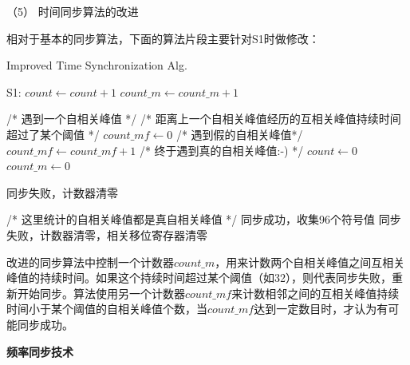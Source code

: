 \documentclass[titlepage]{article}
\numberwithin{figure}{section}
\numberwithin{equation}{section}
\begin{document}
（5） 时间同步算法的改进

相对于基本的同步算法，下面的算法片段主要针对S1时做修改：

\begin{algorithm}[H]
\caption{Improved Time Synchronization Alg.}
\begin{algorithmic}[1]
\State S1:
\State $count \gets count + 1$
\Else
\State $count\_m \gets count\_m + 1$
\EndIf

 /* 遇到一个自相关峰值 */
 /* 距离上一个自相关峰值经历的互相关峰值持续时间超过了某个阈值 */
\State $count\_mf \gets 0$ /* 遇到假的自相关峰值*/
\Else
\State $count\_mf \gets count\_mf + 1$ /* 终于遇到真的自相关峰值:-) */
\State $count \gets 0$
\State $count\_m \gets 0$
\EndIf
\EndIf

\State 同步失败，计数器清零
\EndIf

 /* 这里统计的自相关峰值都是真自相关峰值 */
\State 同步成功，收集96个符号值
\Else
\State 同步失败，计数器清零，相关移位寄存器清零
\EndIf
\EndIf

\end{algorithmic}
\end{algorithm}

改进的同步算法中控制一个计数器$count\_m$，用来计数两个自相关峰值之间互相关峰值的持续时间。如果这个持续时间超过某个阈值（如32），则代表同步失败，重新开始同步。算法使用另一个计数器$count\_mf$来计数相邻之间的互相关峰值持续时间小于某个阈值的自相关峰值个数，当$count\_mf$达到一定数目时，才认为有可能同步成功。


\textbf{频率同步技术}




\end{document}

